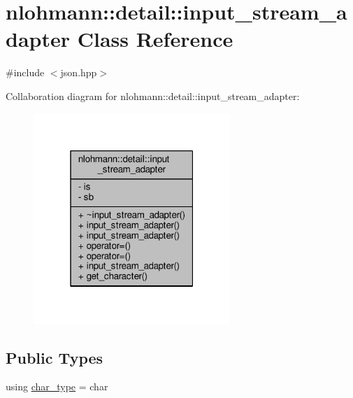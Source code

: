 \hypertarget{classnlohmann_1_1detail_1_1input__stream__adapter}{}\section{nlohmann\+:\+:detail\+:\+:input\+\_\+stream\+\_\+adapter Class Reference}
\label{classnlohmann_1_1detail_1_1input__stream__adapter}


{\ttfamily \#include $<$json.\+hpp$>$}



Collaboration diagram for nlohmann\+:\+:detail\+:\+:input\+\_\+stream\+\_\+adapter\+:
\nopagebreak
\begin{figure}[H]
\begin{center}
\leavevmode
\includegraphics[width=211pt]{classnlohmann_1_1detail_1_1input__stream__adapter__coll__graph}
\end{center}
\end{figure}
\subsection*{Public Types}
\begin{DoxyCompactItemize}
\item 
using \hyperlink{classnlohmann_1_1detail_1_1input__stream__adapter_a72f0713587f6bb3f3fbaae7d34c0ca39}{char\+\_\+type} = char
\end{DoxyCompactItemize}

